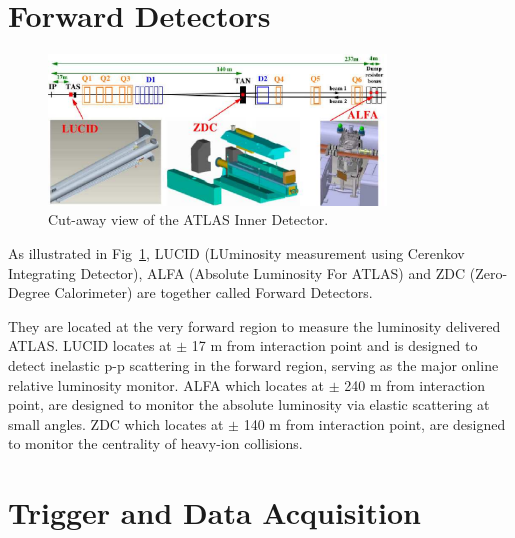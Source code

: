 \section{Forward Detectors}
\label{sec:for}
\begin{figure}[htbp]
 \begin{center}
 \includegraphics[width=0.8\textwidth]{chapters/c4/figures/forward}
 \end{center}
 \caption{Cut-away view of the ATLAS Inner Detector.}
 \label{fig:forward}
\end{figure}
\par As illustrated in Fig~\ref{fig:forward}, LUCID (LUminosity measurement using Cerenkov Integrating Detector), ALFA (Absolute Luminosity For ATLAS) and ZDC 
 (Zero-Degree Calorimeter) are together called Forward Detectors. 
 \par They are located at the very forward region to measure the luminosity delivered ATLAS. LUCID locates at $\pm$ 17 m from interaction point and is designed to 
 detect inelastic p-p scattering in the forward region, serving as the major online relative luminosity monitor. 
 ALFA which locates at $\pm$ 240 m from interaction point, are designed to monitor the absolute luminosity via elastic scattering at small angles. 
 ZDC which locates at $\pm$ 140 m from interaction point, are designed to monitor the centrality of heavy-ion collisions.

\section{Trigger and Data Acquisition}
\label{sec:data}


